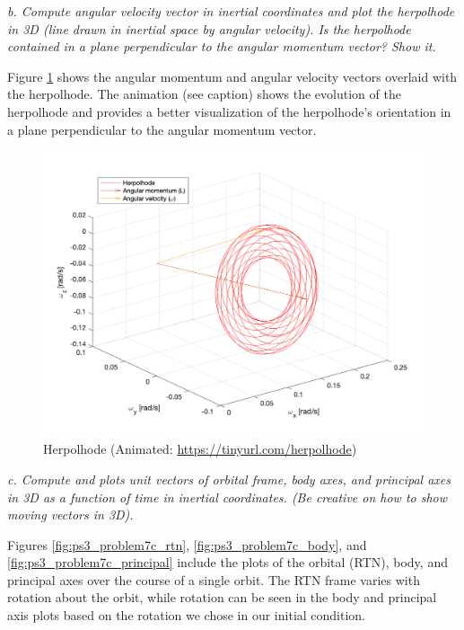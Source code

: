 \textit{b. Compute angular velocity vector in inertial coordinates and plot the herpolhode in 3D (line drawn in inertial space by angular velocity). Is the herpolhode contained in a plane perpendicular to the angular momentum vector? Show it.}

Figure \ref{fig:ps3_problem7b} shows the angular momentum and angular velocity vectors overlaid with the herpolhode. The animation (see caption) shows the evolution of the herpolhode and provides a better visualization of the herpolhode's orientation in a plane perpendicular to the angular momentum vector. 

\begin{figure}[H]
\centering
\includegraphics[scale=0.7]{Images/ps3_problem7b.png}
\caption{Herpolhode (Animated: \protect\url{https://tinyurl.com/herpolhode})}
\label{fig:ps3_problem7b}
\end{figure}

\textit{c. Compute and plots unit vectors of orbital frame, body axes, and principal axes in 3D as a function of time in inertial coordinates. (Be creative on how to show moving vectors in 3D).}

Figures \ref{fig:ps3_problem7c_rtn}, \ref{fig:ps3_problem7c_body}, and \ref{fig:ps3_problem7c_principal} include the plots of the orbital (RTN), body, and principal axes over the course of a single orbit. The RTN frame varies with rotation about the orbit, while rotation can be seen in the body and principal axis plots based on the rotation we chose in our initial condition.

